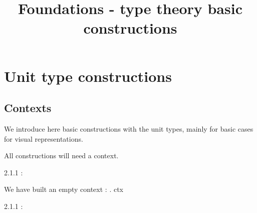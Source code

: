 \documentclass[12pt]{article}
\begin{document}
\title{Foundations - type theory basic constructions}
 
\maketitle
\tableofcontents

\section{Unit type constructions}


\subsection{Contexts}

We introduce here basic constructions with the unit types, mainly for basic cases for visual representations.

All constructions will need a context.

\begin{context_env}{2.1.1}
 \probe :

 \probe
\end{context_env}

We have built an empty context : $.$ ctx

\begin{construction}{2.1.1}
 \probe :

   \probe
\end{construction}
\end{document}
